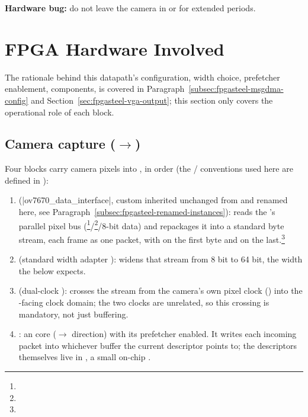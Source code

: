 \begin{warningbox}
\textbf{Hardware bug:} do not leave the camera in  or  for extended periods.\footnotemark
\end{warningbox}

\section{FPGA Hardware Involved}
\label{sec:fpgasteel-simple-forwarding-hardware}

The rationale behind this datapath's configuration, width choice, prefetcher enablement,  components, is covered in Paragraph~\ref{subsec:fpgasteel-msgdma-config} and Section~\ref{sec:fpgasteel-vga-output}; this section only covers the operational role of each block.

\subsection{Camera capture ($\rightarrow$)}
\label{subsec:fpgasteel-simple-forwarding-camera-capture}

Four blocks carry camera pixels into  , in order (the / conventions used here are defined in \cite{AVALON-SPEC}):

\begin{enumerate}
    \item \textbf{} (|ov7670_data_interface|, custom  inherited unchanged from  and renamed here, see Paragraph~\ref{subsec:fpgasteel-renamed-instances}): reads the 's parallel pixel bus (\footnote{}/\footnote{}/8-bit data) and repackages it into a standard  byte stream, each frame as one packet, with  on the first byte and  on the last.\footnote{}
    \item \textbf{} (standard  width adapter ): widens that stream from 8 bit to 64 bit, the width the  below expects.
    \item \textbf{} (dual-clock ): crosses the stream from the camera's own pixel clock () into the -facing clock domain; the two clocks are unrelated, so this crossing is mandatory, not just buffering.
    \item \textbf{}: an  core ($\rightarrow$ direction) with its prefetcher enabled. It writes each incoming packet into whichever  buffer the current descriptor points to; the descriptors themselves live in , a small on-chip .
\end{enumerate}

